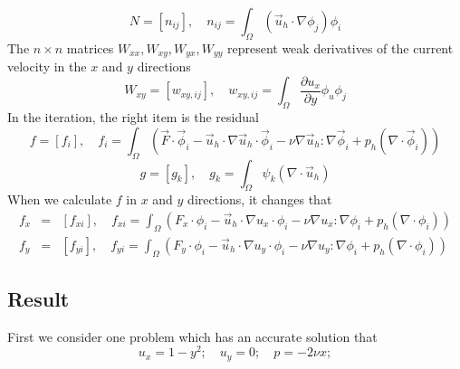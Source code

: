 \documentclass[a4paper]{article}
\begin{document}
\begin{equation}
N = [n_{ij}], \quad n_{ij} = \int_{\Omega} (\vec{u}_h\cdot \nabla\phi_j)\phi_i
\label{mt::N}
\end{equation}
The $n\times n$ matrices $W_{xx}, W_{xy}, W_{yx}, W_{yy}$ represent weak derivatives of the current velocity in the $x$ and $y$ directions
\begin{equation}
W_{xy} = [w_{xy,ij}],\quad w_{xy,ij} = \int_{\Omega} \frac{\partial u_x}{\partial y}\phi_u \phi_j
\label{mt::W}
\end{equation}
In the iteration, the right item is the residual
\begin{equation}
f = [f_i],\quad f_i=\int_{\Omega}(\vec{F}\cdot\vec{\phi}_i-\vec{u}_h\cdot\nabla\vec{u}_h\cdot\vec{\phi}_i-\nu\nabla\vec{u}_h:\nabla\vec{\phi}_i+p_h(\nabla\cdot\vec{\phi}_i))
\end{equation}
\begin{equation}
g = [g_k],\quad g_k=\int_{\Omega}\psi_k(\nabla \cdot \vec{u}_h)
\end{equation}
When we calculate $f$ in $x$ and $y$ directions, it changes that
\begin{equation}
\begin{array}{rcl}
f_x &=& [f_{xi}],\quad f_{xi}=\int_{\Omega}(F_x\cdot\phi_i-\vec{u}_h\cdot\nabla u_x\cdot\phi_i-\nu\nabla u_x:\nabla\phi_i+p_h(\nabla\cdot\phi_i)) \\
f_y &=& [f_{yi}],\quad f_{yi}=\int_{\Omega}(F_y\cdot\phi_i-\vec{u}_h\cdot\nabla u_y\cdot\phi_i-\nu\nabla u_y:\nabla\phi_i+p_h(\nabla\cdot\phi_i))
\label{mt::f}
\end{array}
\end{equation}
\subsection{Result}
First we consider one problem which has an accurate solution that
\begin{equation}
u_x = 1-y^2;\quad u_y = 0;\quad p=-2\nu x;
\label{pr::accurate}
\end{equation}
\end{document}
